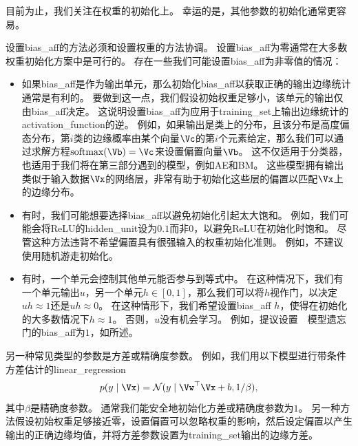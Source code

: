 目前为止，我们关注在权重的初始化上。
幸运的是，其他参数的初始化通常更容易。


设置\gls{bias_aff}的方法必须和设置权重的方法协调。
设置\gls{bias_aff}为零通常在大多数权重初始化方案中是可行的。
存在一些我们可能设置\gls{bias_aff}为非零值的情况：

\begin{itemize}
\item 如果\gls{bias_aff}是作为输出单元，那么初始化\gls{bias_aff}以获取正确的输出边缘统计通常是有利的。
要做到这一点，我们假设初始权重足够小，该单元的输出仅由\gls{bias_aff}决定。
这说明设置\gls{bias_aff}为应用于\gls{training_set}上输出边缘统计的\gls{activation_function}的逆。
例如，如果输出是类上的分布，且该分布是高度偏态分布，第$i$类的边缘概率由某个向量$\Vc$的第$i$个元素给定，那么我们可以通过求解方程$\text{softmax}(\Vb)=\Vc$来设置偏置向量$\Vb$。
这不仅适用于分类器，也适用于我们将在第三部分遇到的模型，例如\gls{AE}和\gls{BM}。
这些模型拥有输出类似于输入数据$\Vx$的网络层，非常有助于初始化这些层的偏置以匹配$\Vx$上的边缘分布。


\item 有时，我们可能想要选择\gls{bias_aff}以避免初始化引起太大饱和。
例如，我们可能会将ReLU的\gls{hidden_unit}设为$0.1$而非$0$，以避免ReLU在初始化时饱和。
尽管这种方法违背不希望偏置具有很强输入的权重初始化准则。
例如，不建议使用随机游走初始化\citep{Sussillo-2014}。


\item 有时，一个单元会控制其他单元能否参与到等式中。
在这种情况下，我们有一个单元输出$u$，另一个单元$h\in[0,1]$，那么我们可以将$h$视作门，以决定$uh\approx 1$还是$uh\approx 0$。
在这种情形下，我们希望设置\gls{bias_aff} $h$，使得在初始化的大多数情况下$h\approx 1$。
否则，$u$没有机会学习。
例如，\cite{Jozefowicz-et-al-2015}提议设置~~模型遗忘门的\gls{bias_aff}为$1$，如所述。
\end{itemize}


另一种常见类型的参数是方差或精确度参数。
例如，我们用以下模型进行带条件方差估计的\gls{linear_regression}
\begin{equation}
    p(y\mid\Vx) = \mathcal{N} (y \mid \Vw^\top \Vx + b, 1/\beta) ,
\end{equation}
其中$\beta$是精确度参数。
通常我们能安全地初始化方差或精确度参数为$1$。
另一种方法假设初始权重足够接近零，设置偏置可以忽略权重的影响，然后设定偏置以产生输出的正确边缘均值，并将方差参数设置为\gls{training_set}输出的边缘方差。


